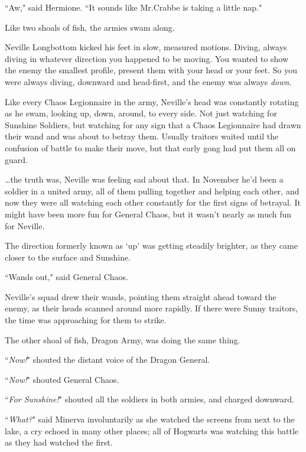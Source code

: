 ``Aw," said Hermione. ``It sounds like Mr.\?Crabbe is taking a little nap."

\later

Like two shoals of fish, the armies swam along.

Neville Longbottom kicked his feet in slow, measured motions. Diving, always diving in whatever direction you happened to be moving. You wanted to show the enemy the smallest profile, present them with your head or your feet. So you were always diving, downward and head-first, and the enemy was always \emph{down}.

Like every Chaos Legionnaire in the army, Neville's head was constantly rotating as he swam, looking up, down, around, to every side. Not just watching for Sunshine Soldiers, but watching for any sign that a Chaos Legionnaire had drawn their wand and was about to betray them. Usually traitors waited until the confusion of battle to make their move, but that early gong had put them all on guard.

{\ldots}the truth was, Neville was feeling sad about that. In November he'd been a soldier in a united army, all of them pulling together and helping each other, and now they were all watching each other constantly for the first signs of betrayal. It might have been more fun for General Chaos, but it wasn't nearly as much fun for Neville.

The direction formerly known as `up' was getting steadily brighter, as they came closer to the surface and Sunshine.

``Wands out," said General Chaos.

Neville's squad drew their wands, pointing them straight ahead toward the enemy, as their heads scanned around more rapidly. If there were Sunny traitors, the time was approaching for them to strike.

The other shoal of fish, Dragon Army, was doing the same thing.

``\emph{Now!}" shouted the distant voice of the Dragon General.

``\emph{Now!}" shouted General Chaos.

``\emph{For Sunshine!}" shouted all the soldiers in both armies, and charged downward.

\later

``\emph{What?}" said Minerva involuntarily as she watched the screens from next to the lake, a cry echoed in many other places; all of Hogwarts was watching this battle as they had watched the first.

